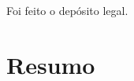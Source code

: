 Foi feito o depósito legal.\\\endgroup


\chapter*{Resumo}

{\footnotesize
{}
\ifdef{\sobretradutor}{\sobretradutor}{\relax}
\ifdef{\sobreorganizador}{\sobreorganizador}{\relax}}
